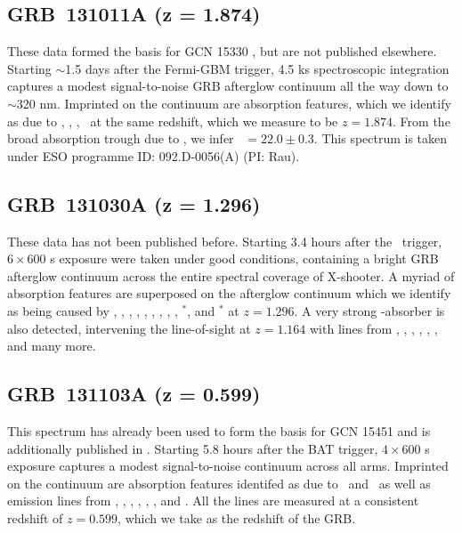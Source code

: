 \documentclass[longauth]{aa}    %
\begin{document}
\subsection{GRB~131011A (z = 1.874)}\label{131011}

These data formed the basis for GCN 15330 \citep{GCN15330}, but are not published
elsewhere. Starting $\sim$1.5 days after the Fermi-GBM trigger, 4.5 ks
spectroscopic integration captures a modest signal-to-noise GRB afterglow
continuum all the way down to $\sim$320 nm. Imprinted on the continuum are
absorption features, which we identify as due to \lya, \feii,  \mgii, \mgi~at
the same redshift, which we measure to be $z = 1.874$. From the broad absorption
trough due to \lya, we infer \nh~$= 22.0 \pm 0.3$. This spectrum is taken under
ESO programme ID: 092.D-0056(A) (PI: Rau).

\subsection{GRB~131030A (z = 1.296)}	
\label{131030}

These data has not been published before. Starting 3.4 hours after the
\swift~trigger, $6\times600$ s exposure were taken under good conditions,
containing a bright GRB afterglow continuum across the entire spectral coverage
of X-shooter. A myriad of absorption features are superposed on the afterglow
continuum which we identify as being caused by \SIiv, \SIii, \civ, \alii,
\aliii, \znii, \crii, \NIii, \feii, \NIii$^*$, and \feii$^*$ at $z = 1.296$. A
very strong \mgii-absorber is also detected, intervening the line-of-sight at $z
= 1.164$ with lines from \SIii, \civ, \aliii, \aliii, \feii, \mnii, and many
more.

\subsection{GRB~131103A (z = 0.599)}\label{131103}

This spectrum has already been used to form the basis for GCN 15451
\citep{GCN15451} and is additionally published in \citet{Kruhler2015}. Starting
5.8 hours after the BAT trigger, $4\times600$ s exposure captures a modest
signal-to-noise continuum across all arms. Imprinted on the continuum are
absorption features identifed as due to \feii~and \mgii~as well as emission
lines from \oii, \hd, \hg, \hb, \oiii, \ha, and \niil. All the lines are measured
at a consistent redshift of $z = 0.599$, which we take as the redshift of the
GRB.
\end{document}
